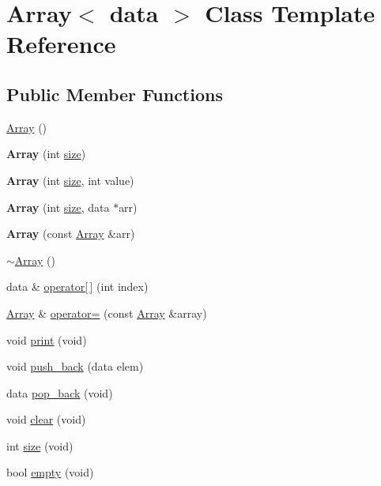 \hypertarget{classArray}{}\section{Array$<$ data $>$ Class Template Reference}
\label{classArray}
\subsection*{Public Member Functions}
\begin{DoxyCompactItemize}
\item 
\hyperlink{classArray_a2a76209eb40074ca13f2925ac9c7097b}{Array} ()
\item 
\mbox{\label{classArray_a0b4f1f69e4e3e8cebbdeb451d28472f3}} 
{\bfseries Array} (int \hyperlink{classArray_a973c8dd45c85cef5571ed106ed1a7860}{size})
\item 
\mbox{\label{classArray_af7f4b7cd1f5c1158fa7d3820e723ed93}} 
{\bfseries Array} (int \hyperlink{classArray_a973c8dd45c85cef5571ed106ed1a7860}{size}, int value)
\item 
\mbox{\label{classArray_a8a04730ac79d860de8e7c75e4492f8c5}} 
{\bfseries Array} (int \hyperlink{classArray_a973c8dd45c85cef5571ed106ed1a7860}{size}, data $\ast$arr)
\item 
\mbox{\label{classArray_a4d104451dc87ecad4b4663dd9124693e}} 
{\bfseries Array} (const \hyperlink{classArray}{Array} \&arr)
\item 
\hyperlink{classArray_a29abd12e3f378562dc5f316538d2f8f9}{$\sim$\+Array} ()
\item 
data \& \hyperlink{classArray_a67e1907d0309d06863839d2a7f4a5476}{operator\mbox{[}$\,$\mbox{]}} (int index)
\item 
\hyperlink{classArray}{Array} \& \hyperlink{classArray_a7b110602f7b7d0a809e0866d5a5a5d3c}{operator=} (const \hyperlink{classArray}{Array} \&array)
\item 
void \hyperlink{classArray_a284ec9533533bdf25236033292ca0b3a}{print} (void)
\item 
void \hyperlink{classArray_a79e931f2c8837cccfba2932798d60437}{push\+\_\+back} (data elem)
\item 
data \hyperlink{classArray_a096d7544dd95195f57f88b0fde76fe68}{pop\+\_\+back} (void)
\item 
void \hyperlink{classArray_ae0438c745ed382fecc0467222b1a028b}{clear} (void)
\item 
int \hyperlink{classArray_a973c8dd45c85cef5571ed106ed1a7860}{size} (void)
\item 
bool \hyperlink{classArray_ad8c05cc24898f72f43fbb16502c82ae8}{empty} (void)
\end{DoxyCompactItemize}


